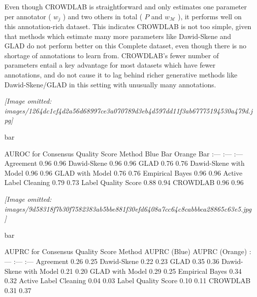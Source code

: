 \documentclass[
]{article}
\begin{document}
Even though CROWDLAB is straightforward and only estimates one parameter
per annotator ( \(w_j\) ) and two others in total ( \(P\) and
\(w_{\mathcal{M}}\) ), it performs well on this annotation-rich dataset.
This indicates CROWDLAB is not too simple, given that methods which
estimate many more parameters like Dawid-Skene and GLAD do not perform
better on this Complete dataset, even though there is no shortage of
annotations to learn from. CROWDLAB's fewer number of parameters entail
a key advantage for most datasets which have fewer annotations, and do
not cause it to lag behind richer generative methods like
Dawid-Skene/GLAD in this setting with unusually many annotations.

\textit{[Image omitted: images/1264dc1cf4d2a56d68997ce3a070789d3eb4d597dd11f3ab67775194530a479d.jpg]}

bar

AUROC for Consensus Quality Score \textbar{} Method \textbar{} Blue Bar
\textbar{} Orange Bar \textbar{} \textbar{} :--- \textbar{} :---
\textbar{} :--- \textbar{} \textbar{} Agreement \textbar{} 0.96
\textbar{} 0.96 \textbar{} \textbar{} Dawid-Skene \textbar{} 0.96
\textbar{} 0.96 \textbar{} \textbar{} GLAD \textbar{} 0.76 \textbar{}
0.76 \textbar{} \textbar{} Dawid-Skene with Model \textbar{} 0.96
\textbar{} 0.96 \textbar{} \textbar{} GLAD with Model \textbar{} 0.76
\textbar{} 0.76 \textbar{} \textbar{} Empirical Bayes \textbar{} 0.96
\textbar{} 0.96 \textbar{} \textbar{} Active Label Cleaning \textbar{}
0.79 \textbar{} 0.73 \textbar{} \textbar{} Label Quality Score
\textbar{} 0.88 \textbar{} 0.94 \textbar{} \textbar{} CROWDLAB
\textbar{} 0.96 \textbar{} 0.96 \textbar{}

\textit{[Image omitted: images/9d58318f7b30f7582383ab5bbe881f30efd6408a7cc64c8cabbbca28865c63e5.jpg]}

bar

AUPRC for Consensus Quality Score \textbar{} Method \textbar{} AUPRC
(Blue) \textbar{} AUPRC (Orange) \textbar{} \textbar{} :--- \textbar{}
:--- \textbar{} :--- \textbar{} \textbar{} Agreement \textbar{} 0.26
\textbar{} 0.25 \textbar{} \textbar{} Dawid-Skene \textbar{} 0.22
\textbar{} 0.23 \textbar{} \textbar{} GLAD \textbar{} 0.35 \textbar{}
0.36 \textbar{} \textbar{} Dawid-Skene with Model \textbar{} 0.21
\textbar{} 0.20 \textbar{} \textbar{} GLAD with Model \textbar{} 0.29
\textbar{} 0.25 \textbar{} \textbar{} Empirical Bayes \textbar{} 0.34
\textbar{} 0.32 \textbar{} \textbar{} Active Label Cleaning \textbar{}
0.04 \textbar{} 0.03 \textbar{} \textbar{} Label Quality Score
\textbar{} 0.10 \textbar{} 0.11 \textbar{} \textbar{} CROWDLAB
\textbar{} 0.31 \textbar{} 0.37 \textbar{}
\end{document}
